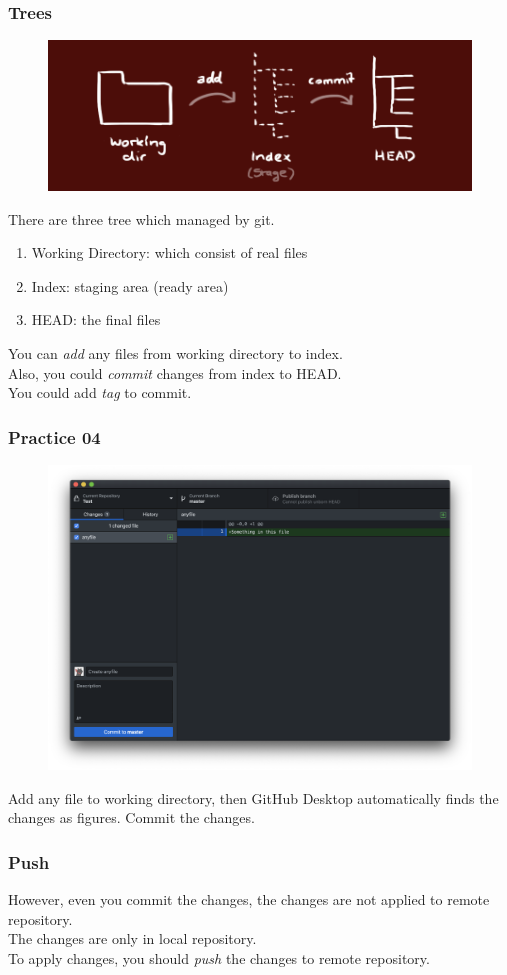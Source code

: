 \documentclass[aspectratio=169]{beamer}
\begin{document}
	\begin{frame}
		\frametitle{Trees}
		
		\begin{figure}
			\centering
			\includegraphics[width=0.5 \linewidth]{figures/trees.png}
		\end{figure}
	
		There are three tree which managed by git. 
		\begin{enumerate}
			\item Working Directory: which consist of real files
			\item Index: staging area (ready area)
			\item HEAD: the final files
		\end{enumerate}
		You can \textit{add} any files from working directory to index. \\
		Also, you could \textit{commit} changes from index to HEAD. \\
		You could add \textit{tag} to commit. 
	\end{frame}

	\begin{frame}
		\frametitle{Practice 04}
		\begin{figure}
			\centering
			\includegraphics[width=0.5 \linewidth]{figures/4.png}
		\end{figure}
		Add any file to working directory, then GitHub Desktop automatically finds the changes as figures. Commit the changes. 
	\end{frame}

	\begin{frame}
		\frametitle{Push}
		
		However, even you commit the changes, the changes are not applied to remote repository. \\
		The changes are only in local repository. \\
		To apply changes, you should \textit{push} the changes to remote repository. 
	\end{frame}
\end{document}
